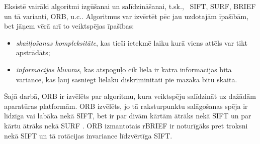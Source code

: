 Eksistē vairāki algoritmi  izgūšanai un
salīdzināšanai, t.sk.,~%
SIFT, %
SURF, BRIEF un tā varianti, ORB, u.c..
Algoritmus var izvērtēt pēc jau uzdotajām īpašībām, 
bet jāņem vērā arī to veiktspējas īpašības:
\begin{itemize}
	\item \emph{skaitļošanas kompleksitāte}, kas tieši ietekmē laiku
		kurā viens attēls var tikt apstrādāts;
	\item \emph{informācijas blīvums}, kas atspoguļo cik liela ir katra
		informācijas bita variance, kas ļauj sasniegt lielāku diskriminitāti
		pie mazāka bitu skaita.
\end{itemize}

Šajā darbā, ORB ir izvēlēts par algoritmu, kura veiktspēju salīdzināt uz
dažādām aparatūras platformām. ORB izvēlēts, jo tā raksturpunktu salāgošanas
spēja ir līdzīga vai labāka nekā SIFT, bet ir par divām kārtām ātrāks nekā
SIFT un par kārtu ātrāks nekā SURF \cite{ORB}.
ORB izmantotais rBRIEF  ir
noturīgāks pret troksni nekā SIFT un tā rotācijas invariance līdzvērtīga SIFT.


